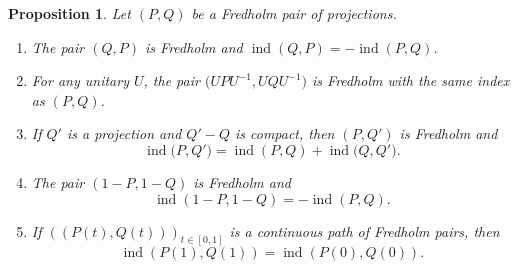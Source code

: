 \documentclass[10pt,a4paper]{amsart}
\numberwithin{equation}{section}
\newtheorem{Proposition}[Theorem]{Proposition}
\DeclareMathOperator{\ind}{ind}
\begin{document}
	 \begin{Proposition}
		\label{Fredholmprops}
		Let $(P,Q)$ be a Fredholm pair of projections.
		\begin{enumerate}\itemsep=0pt
			\item[$(1)$] The pair $(Q,P)$ is Fredholm and $\ind(Q,P)=-\ind(P,Q)$.
			\item[$(2)$] For any unitary $U$, the pair $\bigl(UPU^{-1}, UQU^{-1}\bigr)$ is Fredholm with the same index as $(P,Q)$.
			\item[$(3)$] If $Q'$ is a projection and $Q'-Q$ is compact, then $(P,Q')$ is Fredholm and
			\[\ind\bigl(P,Q'\bigr)=\ind(P,Q)+\ind\bigl(Q,Q'\bigr).\]
			\item[$(4)$] The pair $(1-P,1-Q)$ is Fredholm and
			\[\ind(1-P,1-Q)=-\ind(P,Q).\]
			\item[$(5)$] If $((P(t),Q(t)))_{t\in [0,1]}$ is a continuous path of Fredholm pairs, then
			\[\ind(P(1),Q(1))=\ind(P(0),Q(0)).\]
    \end{enumerate}
		\end{Proposition}
	
\end{document}
